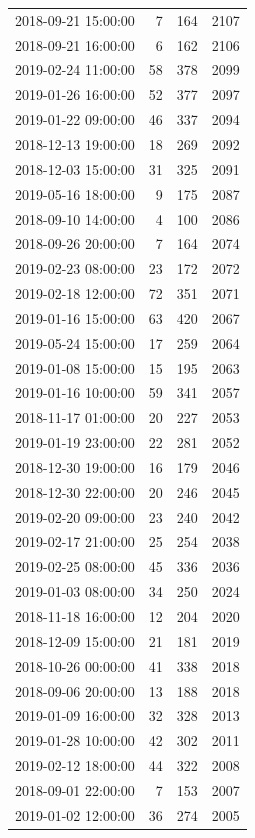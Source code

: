 \begin{tabular}{lrrr}
2018-09-21 15:00:00 & 7 & 164 & 2107 \\
2018-09-21 16:00:00 & 6 & 162 & 2106 \\
2019-02-24 11:00:00 & 58 & 378 & 2099 \\
2019-01-26 16:00:00 & 52 & 377 & 2097 \\
2019-01-22 09:00:00 & 46 & 337 & 2094 \\
2018-12-13 19:00:00 & 18 & 269 & 2092 \\
2018-12-03 15:00:00 & 31 & 325 & 2091 \\
2019-05-16 18:00:00 & 9 & 175 & 2087 \\
2018-09-10 14:00:00 & 4 & 100 & 2086 \\
2018-09-26 20:00:00 & 7 & 164 & 2074 \\
2019-02-23 08:00:00 & 23 & 172 & 2072 \\
2019-02-18 12:00:00 & 72 & 351 & 2071 \\
2019-01-16 15:00:00 & 63 & 420 & 2067 \\
2019-05-24 15:00:00 & 17 & 259 & 2064 \\
2019-01-08 15:00:00 & 15 & 195 & 2063 \\
2019-01-16 10:00:00 & 59 & 341 & 2057 \\
2018-11-17 01:00:00 & 20 & 227 & 2053 \\
2019-01-19 23:00:00 & 22 & 281 & 2052 \\
2018-12-30 19:00:00 & 16 & 179 & 2046 \\
2018-12-30 22:00:00 & 20 & 246 & 2045 \\
2019-02-20 09:00:00 & 23 & 240 & 2042 \\
2019-02-17 21:00:00 & 25 & 254 & 2038 \\
2019-02-25 08:00:00 & 45 & 336 & 2036 \\
2019-01-03 08:00:00 & 34 & 250 & 2024 \\
2018-11-18 16:00:00 & 12 & 204 & 2020 \\
2018-12-09 15:00:00 & 21 & 181 & 2019 \\
2018-10-26 00:00:00 & 41 & 338 & 2018 \\
2018-09-06 20:00:00 & 13 & 188 & 2018 \\
2019-01-09 16:00:00 & 32 & 328 & 2013 \\
2019-01-28 10:00:00 & 42 & 302 & 2011 \\
2019-02-12 18:00:00 & 44 & 322 & 2008 \\
2018-09-01 22:00:00 & 7 & 153 & 2007 \\
2019-01-02 12:00:00 & 36 & 274 & 2005 \\

\end{tabular}
